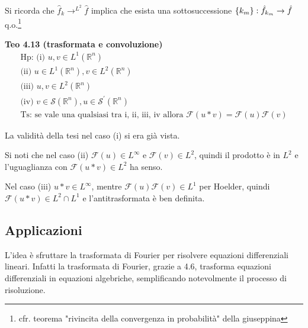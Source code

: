 \documentclass{article}
\begin{document}
Si ricorda che $\hat{f}_{k}\rightarrow ^{L^{2}}\hat{f}$ implica che esista
una sottosuccessione $\left\{ k_{m}\right\} :\hat{f}_{k_{m}}\rightarrow \hat{%
f}$ q.o.\footnote{%
cfr. teorema "rivincita della convergenza in probabilit\`{a}" della
giuseppina}

\textbf{Teo 4.13 (trasformata e convoluzione)}%
\begin{gather*}
\text{Hp: (i) }u,v\in L^{1}\left( 
\mathbb{R}
^{n}\right) \\
\text{(ii) }u\in L^{1}\left( 
\mathbb{R}
^{n}\right) ,v\in L^{2}\left( 
\mathbb{R}
^{n}\right) \\
\text{(iii) }u,v\in L^{2}\left( 
\mathbb{R}
^{n}\right) \\
\text{(iv) }v\in \mathcal{S}\left( 
\mathbb{R}
^{n}\right) ,u\in \mathcal{S}^{\prime }\left( 
\mathbb{R}
^{n}\right) \\
\text{Ts: se vale una qualsiasi tra i, ii, iii, iv allora }\mathcal{F}\left(
u\ast v\right) =\mathcal{F}\left( u\right) \mathcal{F}\left( v\right)
\end{gather*}

La validit\`{a} della tesi nel caso (i) si era gi\`{a} vista.

Si noti che nel caso (ii) $\mathcal{F}\left( u\right) \in L^{\infty }$ e $%
\mathcal{F}\left( v\right) \in L^{2}$, quindi il prodotto \`{e} in $L^{2}$ e
l'uguaglianza con $\mathcal{F}\left( u\ast v\right) \in L^{2}$ ha senso.

Nel caso (iii) $u\ast v\in L^{\infty }$, mentre $\mathcal{F}\left( u\right) 
\mathcal{F}\left( v\right) \in L^{1}$ per Hoelder, quindi $\mathcal{F}\left(
u\ast v\right) \in L^{2}\cap L^{1}$ e l'antitrasformata \`{e} ben definita.

\subsection{Applicazioni}

L'idea \`{e} sfruttare la trasformata di Fourier per risolvere equazioni
differenziali lineari. Infatti la trasformata di Fourier, grazie a 4.6,
trasforma equazioni differenziali in equazioni algebriche, semplificando
notevolmente il processo di risoluzione.
\end{document}

